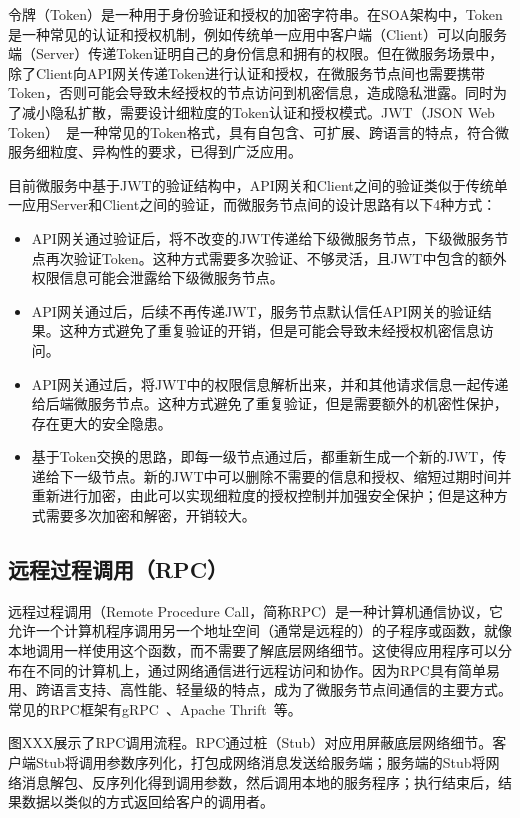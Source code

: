 令牌（Token）是一种用于身份验证和授权的加密字符串。在SOA架构中，Token是一种常见的认证和授权机制，例如传统单一应用中客户端（Client）可以向服务端（Server）传递Token证明自己的身份信息和拥有的权限。但在微服务场景中，除了Client向API网关传递Token进行认证和授权，在微服务节点间也需要携带Token，否则可能会导致未经授权的节点访问到机密信息，造成隐私泄露。同时为了减小隐私扩散，需要设计细粒度的Token认证和授权模式。JWT（JSON Web Token）~\cite{}是一种常见的Token格式，具有自包含、可扩展、跨语言的特点，符合微服务细粒度、异构性的要求，已得到广泛应用。

目前微服务中基于JWT的验证结构中，API网关和Client之间的验证类似于传统单一应用Server和Client之间的验证，而微服务节点间的设计思路有以下4种方式：

\begin{itemize}
    \item API网关通过验证后，将不改变的JWT传递给下级微服务节点，下级微服务节点再次验证Token。这种方式需要多次验证、不够灵活，且JWT中包含的额外权限信息可能会泄露给下级微服务节点。
    \item API网关通过后，后续不再传递JWT，服务节点默认信任API网关的验证结果。这种方式避免了重复验证的开销，但是可能会导致未经授权机密信息访问。
    \item API网关通过后，将JWT中的权限信息解析出来，并和其他请求信息一起传递给后端微服务节点。这种方式避免了重复验证，但是需要额外的机密性保护，存在更大的安全隐患。
    \item 基于Token交换的思路，即每一级节点通过后，都重新生成一个新的JWT，传递给下一级节点。新的JWT中可以删除不需要的信息和授权、缩短过期时间并重新进行加密，由此可以实现细粒度的授权控制并加强安全保护；但是这种方式需要多次加密和解密，开销较大。
\end{itemize}

\subsection{远程过程调用（RPC）}

远程过程调用（Remote Procedure Call，简称RPC）是一种计算机通信协议，它允许一个计算机程序调用另一个地址空间（通常是远程的）的子程序或函数，就像本地调用一样使用这个函数，而不需要了解底层网络细节。这使得应用程序可以分布在不同的计算机上，通过网络通信进行远程访问和协作。因为RPC具有简单易用、跨语言支持、高性能、轻量级的特点，成为了微服务节点间通信的主要方式。常见的RPC框架有gRPC~\cite{}、Apache Thrift~\cite{}等。

图XXX展示了RPC调用流程。RPC通过桩（Stub）对应用屏蔽底层网络细节。客户端Stub将调用参数序列化，打包成网络消息发送给服务端；服务端的Stub将网络消息解包、反序列化得到调用参数，然后调用本地的服务程序；执行结束后，结果数据以类似的方式返回给客户的调用者。

